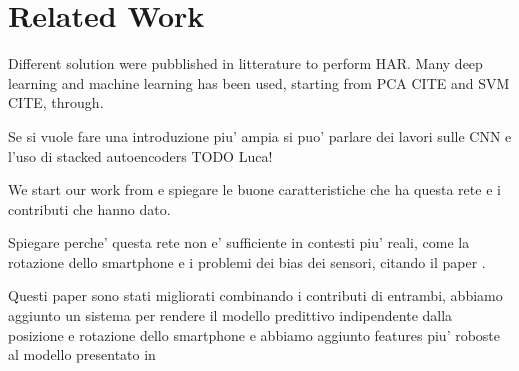 
\section{Related Work}
\label{sec:related_work}
Different solution were pubblished in litterature to perform HAR. Many deep learning and machine learning has been used, starting from PCA CITE and SVM CITE, through.


Se si vuole fare una introduzione piu' ampia si puo' parlare dei lavori sulle CNN e l'uso di stacked autoencoders TODO Luca!

We start our work from \cite{ignatov2018real} e spiegare le buone caratteristiche che ha questa rete e i contributi che hanno dato.

Spiegare perche' questa rete non e' sufficiente in contesti piu' reali, come la rotazione dello smartphone e i problemi dei bias dei sensori, citando il paper \cite{stisen2015smart}.

Questi paper sono stati migliorati combinando i contributi di entrambi, abbiamo aggiunto un sistema per rendere il modello predittivo indipendente dalla posizione e rotazione dello smartphone e abbiamo aggiunto features piu' roboste al modello presentato in \cite{ignatov2018real}


